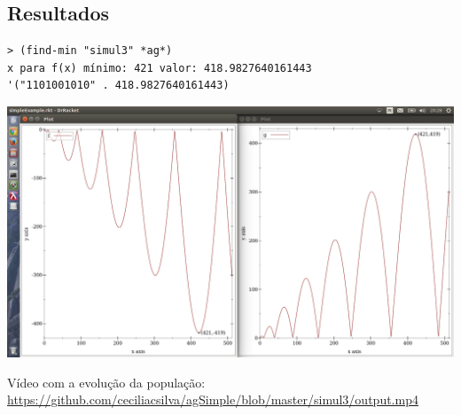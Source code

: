 \documentclass[11pt]{article}
\begin{document}
\subsection{Resultados}
\label{sec-1-3}

\begin{verbatim}
> (find-min "simul3" *ag*)
x para f(x) mínimo: 421 valor: 418.9827640161443
'("1101001010" . 418.9827640161443)
\end{verbatim}

\includegraphics[width=.9\linewidth]{imagens/ag-fgs3.png}

Vídeo com a evolução da população: \url{https://github.com/ceciliacsilva/agSimple/blob/master/simul3/output.mp4}
\end{document}
